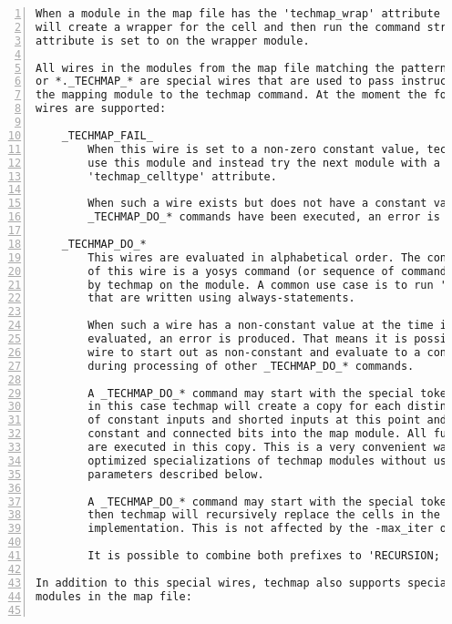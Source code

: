 \begin{lstlisting}[numbers=left,frame=single]
When a module in the map file has the 'techmap_wrap' attribute set, techmap
will create a wrapper for the cell and then run the command string that the
attribute is set to on the wrapper module.

All wires in the modules from the map file matching the pattern _TECHMAP_*
or *._TECHMAP_* are special wires that are used to pass instructions from
the mapping module to the techmap command. At the moment the following special
wires are supported:

    _TECHMAP_FAIL_
        When this wire is set to a non-zero constant value, techmap will not
        use this module and instead try the next module with a matching
        'techmap_celltype' attribute.

        When such a wire exists but does not have a constant value after all
        _TECHMAP_DO_* commands have been executed, an error is generated.

    _TECHMAP_DO_*
        This wires are evaluated in alphabetical order. The constant text value
        of this wire is a yosys command (or sequence of commands) that is run
        by techmap on the module. A common use case is to run 'proc' on modules
        that are written using always-statements.

        When such a wire has a non-constant value at the time it is to be
        evaluated, an error is produced. That means it is possible for such a
        wire to start out as non-constant and evaluate to a constant value
        during processing of other _TECHMAP_DO_* commands.

        A _TECHMAP_DO_* command may start with the special token 'CONSTMAP; '.
        in this case techmap will create a copy for each distinct configuration
        of constant inputs and shorted inputs at this point and import the
        constant and connected bits into the map module. All further commands
        are executed in this copy. This is a very convenient way of creating
        optimized specializations of techmap modules without using the special
        parameters described below.

        A _TECHMAP_DO_* command may start with the special token 'RECURSION; '.
        then techmap will recursively replace the cells in the module with their
        implementation. This is not affected by the -max_iter option.

        It is possible to combine both prefixes to 'RECURSION; CONSTMAP; '.

In addition to this special wires, techmap also supports special parameters in
modules in the map file:


\end{lstlisting}
